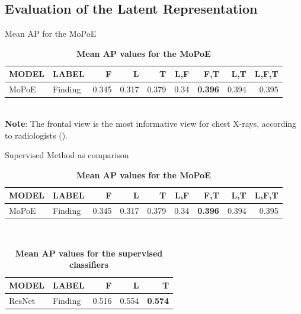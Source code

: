     \subsection{Evaluation of the Latent Representation}
    \begin{frame}{Mean AP for the MoPoE}
                \begin{table}
                \centering
            \begin{tabular}{llrrrrrrr}
            MODEL & LABEL &      F &      L &      T &   L,F &    F,T &    L,T &  L,F,T \\
            \midrule
            MoPoE & Finding &  0.345 &  0.317 &  0.379 &  0.34 &  \textbf{0.396} &  0.394 &  0.395 \\
            
            \end{tabular}
            \caption{\textbf{Mean AP values for the MoPoE}}
            \end{table}\\
    \pause
    \small{\textbf{Note}: The frontal view is the most informative view for chest X-rays, according to radiologists (\cite{kovaleva2020towards}).}
    \end{frame}
    
    \begin{frame}{Supervised Method as comparison}
            \begin{table}
                \centering
            \begin{tabular}{llrrrrrrr}
            MODEL & LABEL &      F &      L &      T &   L,F &    F,T &    L,T &  L,F,T \\
            \midrule
            MoPoE & Finding &  0.345 &  0.317 &  0.379 &  0.34 &  \textbf{0.396} &  0.394 &  0.395 \\
            
            \end{tabular}
            \caption{\textbf{Mean AP values for the MoPoE}}
            \end{table}\\
            
                        \begin{table}[]
                \centering
            \begin{tabular}{llrrr}
            MODEL & LABEL &      F &      L &      T       \\
            \midrule
            ResNet & Finding &  0.516 &  0.554 &  \textbf{0.574} \\
            \end{tabular}
            \caption{\textbf{Mean AP values for the supervised classifiers}}
            \end{table}
    \end{frame}
    

